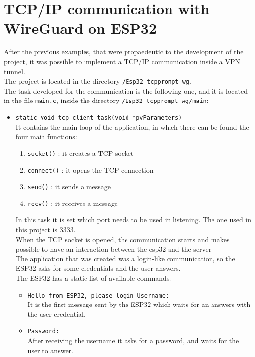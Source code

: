 \section{TCP/IP communication with WireGuard on ESP32}\label{sec:VPNproject}
After the previous examples, that were propaedeutic to the development of the project, it was possible to implement a TCP/IP communication inside a VPN tunnel.\\ 
The project is located in the directory \texttt{/Esp32\_tcpprompt\_wg}.\\
The task developed for the communication is the following one, and it is located in the file \texttt{main.c}, inside the directory 
\texttt{/Esp32\_tcpprompt\_wg/main}:
\begin{itemize}
    \item \texttt{static void tcp\_client\_task(void *pvParameters)}\\ It contains the main loop of the application, in which there can be found the four main functions:
     \begin{enumerate}
        \item \texttt{socket()} : it creates a TCP socket
        \item \texttt{connect()} : it opens the TCP connection
        \item \texttt{send()} : it sends a message
        \item \texttt{recv()} : it receives a message 
    \end{enumerate}
    In this task it is set which port needs to be used in listening. The one used in this project is 3333.\\
    When the TCP socket is opened, the communication starts and makes possible to have an interaction between the esp32 and the server.\\
    The application that was created was a login-like communication, so the ESP32 asks for some credentials and the user answers.\\
    The ESP32 has a static list of available commands:
    \begin{itemize}
        \item \texttt{Hello from ESP32, please login Username:}\\
        It is the first message sent by the ESP32 which waits for an answers with the user credential. 
        \item \texttt{Password:}\\
        After receiving the username it asks for a password, and waits for the user to answer.

\end{itemize}
\end{itemize}

